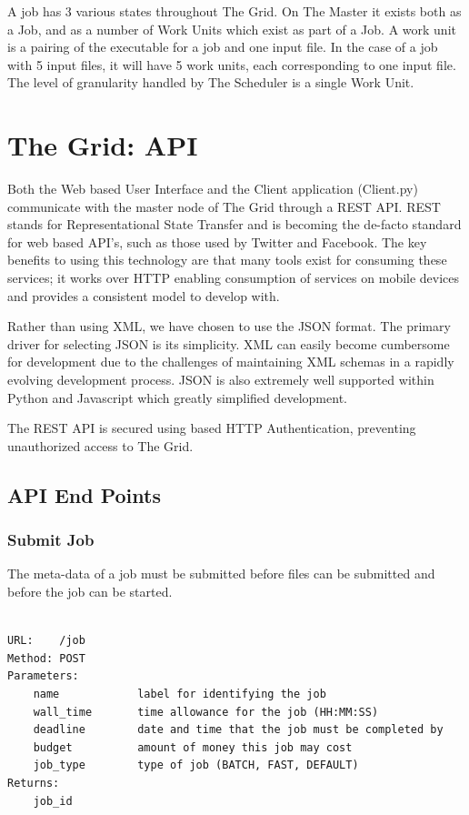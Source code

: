 A job has 3 various states throughout The Grid. On The Master it exists both as a Job, and as a number of Work Units which exist as part of a Job. A work unit is a pairing of the executable for a job and one input file. In the case of a job with 5 input files, it will have 5 work units, each corresponding to one input file. The level of granularity handled by The Scheduler is a single Work Unit. 

\chapter{The Grid: API}
\label{thegrid:api}

Both the Web based User Interface and the Client application (Client.py) communicate with the master node of The Grid through a REST API. REST stands for Representational State Transfer and is becoming the de-facto standard for web based API's, such as those used by Twitter and Facebook. The key benefits to using this technology are that many tools exist for consuming these services; it works over HTTP enabling consumption of services on mobile devices and provides a consistent model to develop with.

Rather than using XML, we have chosen to use the JSON format. The primary driver for selecting JSON is its simplicity. XML can easily become cumbersome for development due to the challenges of maintaining XML schemas in a rapidly evolving development process. JSON is also extremely well supported within Python and Javascript which greatly simplified development.

The REST API is secured using based HTTP Authentication, preventing unauthorized access to The Grid.

\section{API End Points}
\label{apiendpoints}

\subsection{Submit Job}
\label{submitjob}

The meta-data of a job must be submitted before files can be submitted and before the job can be started.

\begin{adjustwidth}{2.5em}{2.5em}
\begin{verbatim}

URL:    /job
Method: POST
Parameters: 
    name            label for identifying the job
    wall_time       time allowance for the job (HH:MM:SS)
    deadline        date and time that the job must be completed by
    budget          amount of money this job may cost
    job_type        type of job (BATCH, FAST, DEFAULT)
Returns:    
    job_id

\end{verbatim}
\end{adjustwidth}

